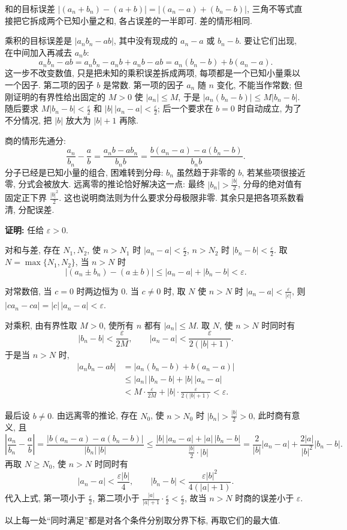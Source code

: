 \documentclass[UTF8,openany]{ctexbook}
\theoremstyle{chinesetextbook}
\newenvironment{cnproof}{\par\indent\textbf{证明:} \ignorespaces}{\par}
\begin{document}
和的目标误差 $|(a_n+b_n)-(a+b)|=|(a_n-a)+(b_n-b)|$, 三角不等式直接把它拆成两个已知小量之和, 各占误差的一半即可. 差的情形相同.

乘积的目标误差是 $|a_nb_n-ab|$, 其中没有现成的 $a_n-a$ 或 $b_n-b$. 要让它们出现, 在中间加入再减去 $a_nb$:
\[
a_nb_n-ab=a_nb_n-a_nb+a_nb-ab=a_n(b_n-b)+b(a_n-a).
\]
这一步不改变数值, 只是把未知的乘积误差拆成两项, 每项都是一个已知小量乘以一个因子. 第二项的因子 $b$ 是常数. 第一项的因子 $a_n$ 随 $n$ 变化, 不能当作常数; 但刚证明的有界性给出固定的 $M>0$ 使 $|a_n|\le M$, 于是 $|a_n(b_n-b)|\le M|b_n-b|$. 随后要求 $\displaystyle M|b_n-b|<\frac\varepsilon2$ 和 $\displaystyle|b|\,|a_n-a|<\frac\varepsilon2$; 后一个要求在 $b=0$ 时自动成立, 为了不分情况, 把 $|b|$ 放大为 $|b|+1$ 再除.

商的情形先通分:
\[
\frac{a_n}{b_n}-\frac ab=\frac{a_nb-ab_n}{b_nb}
=\frac{b(a_n-a)-a(b_n-b)}{b_nb}.
\]
分子已经是已知小量的组合, 困难转到分母: $b_n$ 虽然趋于非零的 $b$, 若某些项很接近零, 分式会被放大. 远离零的推论恰好解决这一点: 最终 $\displaystyle|b_n|>\frac{|b|}2$, 分母的绝对值有固定正下界 $\displaystyle\frac{|b|^2}2$. 这也说明商法则为什么要求分母极限非零. 其余只是把各项系数看清, 分配误差.
\begin{cnproof}
任给 $\varepsilon>0$.

对和与差, 存在 $N_1,N_2$, 使 $n>N_1$ 时 $\displaystyle|a_n-a|<\frac\varepsilon2$, $n>N_2$ 时 $\displaystyle|b_n-b|<\frac\varepsilon2$. 取 $N=\max\{N_1,N_2\}$, 当 $n>N$ 时
\[
|(a_n\pm b_n)-(a\pm b)|\le|a_n-a|+|b_n-b|<\varepsilon.
\]

对常数倍, 当 $c=0$ 时两边恒为 $0$. 当 $c\ne0$ 时, 取 $N$ 使 $n>N$ 时 $\displaystyle|a_n-a|<\frac\varepsilon{|c|}$, 则 $|ca_n-ca|=|c|\,|a_n-a|<\varepsilon$.

对乘积, 由有界性取 $M>0$, 使所有 $n$ 都有 $|a_n|\le M$. 取 $N$, 使 $n>N$ 时同时有
\[
|b_n-b|<\frac\varepsilon{2M},\qquad
|a_n-a|<\frac\varepsilon{2(|b|+1)}.
\]
于是当 $n>N$ 时,
\[
\begin{aligned}
|a_nb_n-ab|
&=|a_n(b_n-b)+b(a_n-a)|\\
&\le|a_n|\,|b_n-b|+|b|\,|a_n-a|\\
&<M\cdot\frac\varepsilon{2M}+|b|\cdot\frac\varepsilon{2(|b|+1)}<\varepsilon.
\end{aligned}
\]

最后设 $b\ne0$. 由远离零的推论, 存在 $N_0$, 使 $n>N_0$ 时 $\displaystyle|b_n|>\frac{|b|}2>0$, 此时商有意义, 且
\[
\left|\frac{a_n}{b_n}-\frac ab\right|
=\frac{|b(a_n-a)-a(b_n-b)|}{|b_n|\,|b|}
\le\frac{|b|\,|a_n-a|+|a|\,|b_n-b|}{\frac{|b|}2\cdot|b|}
=\frac2{|b|}|a_n-a|+\frac{2|a|}{|b|^2}|b_n-b|.
\]
再取 $N\ge N_0$, 使 $n>N$ 时同时有
\[
|a_n-a|<\frac{\varepsilon|b|}4,\qquad
|b_n-b|<\frac{\varepsilon|b|^2}{4(|a|+1)}.
\]
代入上式, 第一项小于 $\displaystyle\frac\varepsilon2$, 第二项小于 $\displaystyle\frac{|a|}{|a|+1}\cdot\frac\varepsilon2<\frac\varepsilon2$, 故当 $n>N$ 时商的误差小于 $\varepsilon$.

以上每一处“同时满足”都是对各个条件分别取分界下标, 再取它们的最大值.
\end{cnproof}
\end{document}
